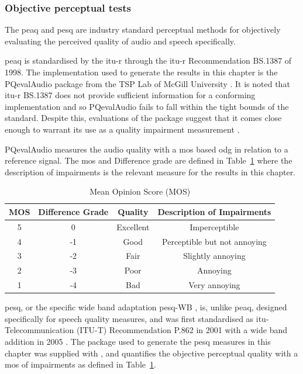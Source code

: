 \subsubsection{Objective perceptual tests}
The \gls{peaq} and \gls{pesq} are industry standard perceptual methods for objectively evaluating the perceived quality of audio and speech specifically.

\gls{peaq} is standardised by the \gls{itu-r} through the \gls{itu-r} Recommendation BS.1387 \cite{BS-1387-1998} of 1998. The implementation used to generate the results in this chapter is the PQevalAudio package from the TSP Lab of McGill University \cite{Kabal2003}. It is noted that \gls{itu-r} BS.1387 does not provide sufficient information for a conforming implementation \cite{Campeanu2005} and so PQevalAudio fails to fall within the tight bounds of the standard. Despite this, evaluations of the package suggest that it comes close enough to warrant its use as a quality impairment measurement \cite{Kabal2003}.

PQevalAudio measures the audio quality with a \gls{mos} based \gls{odg} in relation to a reference signal. The \gls{mos}\cite{P-800-1996} and Difference grade \cite{Kabal2003} are defined in Table~\ref{tab:MOS} where the description of impairments is the relevant measure for the results in this chapter.

\begin{table}\begin{center}
\caption{Mean Opinion Score (MOS)}
\label{tab:MOS}
\begin{tabular}{|c|c|c|c|}\hline
MOS & Difference Grade  & Quality       & Description of Impairments  \\ \hline
5   & 0                 & Excellent     & Imperceptible               \\
4   & -1                & Good          & Perceptible but not annoying\\
3   & -2                & Fair          & Slightly annoying           \\
2   & -3                & Poor          & Annoying                    \\
1   & -4                & Bad           & Very annoying               \\ \hline
\end{tabular}\end{center}\end{table}

\gls{pesq}, or the specific wide band adaptation \gls{pesq}-WB \cite{P862-2-2005}, is, unlike \gls{peaq}, designed specifically for speech quality measures, and was first standardised as \gls{itu}-Telecommunication (ITU-T) Recommendation P.862 in 2001 with a wide band addition in 2005 \cite{P862-2-2005}. The package used to generate the \gls{pesq} measures in this chapter was supplied with \cite{Loizou2007}, and quantifies the objective perceptual quality with a \gls{mos} of impairments as defined in Table~\ref{tab:MOS}.


